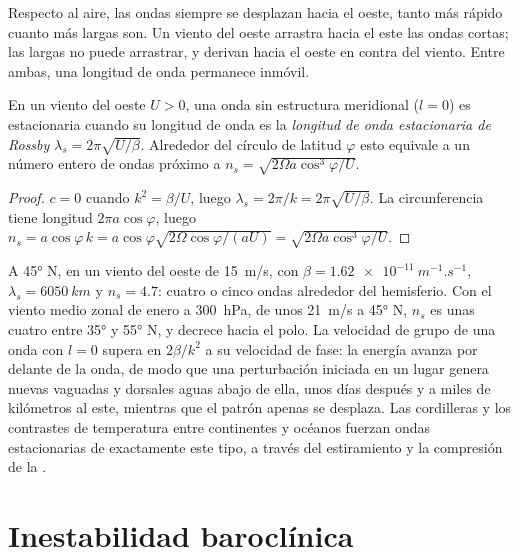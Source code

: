 Respecto al aire, las ondas siempre se desplazan hacia el oeste, tanto más rápido
cuanto más largas son. Un viento del oeste arrastra hacia el este las ondas cortas; las largas
no puede arrastrar, y derivan hacia el oeste en contra del viento. Entre ambas, una
longitud de onda permanece inmóvil.

\begin{proposition}\label{prop:b3:atmospheric-dynamics:stationary}
En un viento del oeste $U > 0$, una onda sin estructura meridional ($l = 0$) es
estacionaria cuando su longitud de onda es la \emph{longitud de onda estacionaria de
Rossby} $\lambda_s =
2\pi\sqrt{U/\beta}$. Alrededor del círculo de latitud $\varphi$ esto equivale a un número entero de
ondas próximo a $n_s = \sqrt{2\Omega a\cos^3\varphi/U}$.
\end{proposition}

\begin{proof}
$c = 0$ cuando $k^2 = \beta/U$, luego $\lambda_s = 2\pi/k = 2\pi\sqrt{U/\beta}$.
La circunferencia tiene longitud $2\pi a\cos\varphi$, luego $n_s = a\cos\varphi\,k =
a\cos\varphi\sqrt{2\Omega\cos\varphi/(aU)} = \sqrt{2\Omega a\cos^3\varphi/U}$.
\end{proof}

A \ang{45} N, en un viento del oeste de \qty{15}{m/s}, con $\beta =
\qty{1.62e-11}{m^{-1}.s^{-1}}$, $\lambda_s = \qty{6050}{km}$ y $n_s =
4.7$: cuatro o cinco ondas alrededor del hemisferio. Con el viento medio zonal
de enero a \qty{300}{hPa}, de unos \qty{21}{m/s} a \ang{45} N, $n_s$ es
unas cuatro entre \ang{35} y \ang{55} N, y decrece hacia el polo. La velocidad de grupo
de una onda con $l = 0$ supera en $2\beta/k^2$ a su velocidad de fase: la energía avanza
por delante de la onda, de modo que una perturbación iniciada en un lugar genera nuevas vaguadas
y dorsales aguas abajo de ella, unos días después y a miles de kilómetros
al este, mientras que el patrón apenas se desplaza. Las cordilleras y los
contrastes de temperatura entre continentes y océanos fuerzan ondas estacionarias
de exactamente este tipo, a través del estiramiento y la compresión de
la .


\section{Inestabilidad baroclínica}\label{sec:b3:atmospheric-dynamics:baroclinic}

